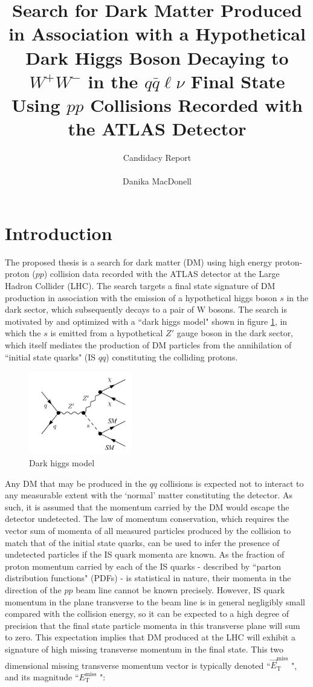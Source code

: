 \documentclass[12pt]{article}
\author{\Large{Candidacy Report} \\
\\
Danika MacDonell}
\title{Search for Dark Matter Produced in Association with a Hypothetical Dark Higgs Boson Decaying to $W^+W^-$ in the $q\bar{q}\ell\nu$ Final State Using $pp$ Collisions Recorded with the ATLAS Detector}
\newcommand*{\met}{\ensuremath{E_\text{T}^\text{miss}} }
\newcommand*{\metvec}{\ensuremath{\vec{E}_\text{T}^\text{miss}} }
\begin{document}
\maketitle

\section{Introduction}

The proposed thesis is a search for dark matter (DM) using high energy proton-proton ($pp$) collision data recorded with the ATLAS detector at the Large Hadron Collider (LHC). The search targets a final state signature of DM production in association with the emission of a hypothetical higgs boson $s$ in the dark sector, which subsequently decays to a pair of W bosons. The search is motivated by and optimized with a ``dark higgs model" \cite{dark_higgs} shown in figure \ref{fig:signal_model}, in which the $s$ is emitted from a hypothetical $Z'$ gauge boson in the dark sector, which itself mediates the production of DM particles from the annihilation of ``initial state quarks" (IS $qq$) constituting the colliding protons.  

\begin{figure}[H]
	\centering
	\includegraphics[width=0.4\textwidth]{figures/Signal_generic.png}
	\caption[]{Dark higgs model}
	\label{fig:signal_model}
\end{figure}

Any DM that may be produced in the $qq$ collisions is expected not to interact to any measurable extent with the `normal' matter constituting the detector. As such, it is assumed that the momentum carried by the DM would escape the detector undetected. The law of momentum conservation, which requires the vector sum of momenta of all measured particles produced by the collision to match that of the initial state quarks, can be used to infer the presence of undetected particles if the IS quark momenta are known. As the fraction of proton momentum carried by each of the IS quarks - described by ``parton distribution functions" (PDFs) \cite{PDF_Review} - is statistical in nature, their momenta in the direction of the $pp$ beam line cannot be known precisely. However, IS quark momentum in the plane transverse to the beam line is in general negligibly small compared with the collision energy, so it can be expected to a high degree of precision that the final state particle momenta in this transverse plane will sum to zero. This expectation implies that DM produced at the LHC will exhibit a signature of high missing transverse momentum in the final state. This two dimensional missing transverse momentum vector is typically denoted ``\metvec", and its magnitude ``\met":
\end{document}
